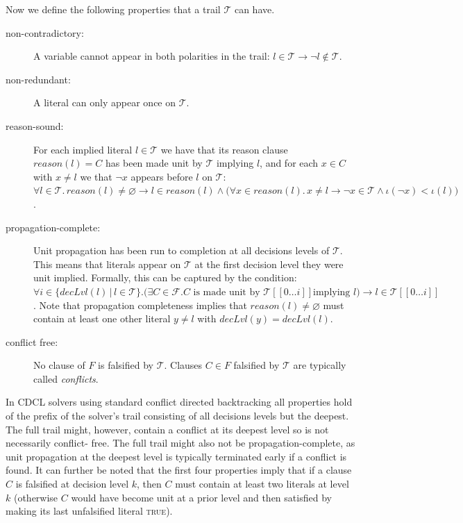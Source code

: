 \documentclass[runningheads]{llncs}
\newcommand{\trail}{\ensuremath{\mathcal{T}}}
\newcommand{\trailIdx}[1]{\ensuremath{\iota(#1)}}
\newcommand{\range}[2]{#1\ldots#2}
\newcommand{\dlevel}[1]{\ensuremath{\mathit{decLvl}(#1)}}
\newcommand{\true}{\textsc{true}\xspace}
\newcommand{\reason}[1]{\ensuremath{\mathit{reason}(#1)}}
\newcommand{\formula}{\ensuremath{\mathcal{F}}}
\renewcommand{\implies}{\rightarrow}
\begin{document}
Now we define the following properties that a trail $\trail$ can have.
\begin{description}
\item[non-contradictory:] A variable cannot appear in both polarities
    in the trail: $l\in \trail\implies \lnot l \not \in \trail$.
\item[non-redundant:] A literal can only appear once on $\trail$.
\item[reason-sound:] For each implied literal $l\in\trail$ we have
    that its reason clause $\reason{l}=C$ has been made unit by
    $\trail$ implying $l$, and for each $x\in C$ with $x\neq l$ we
    that $\lnot x$ appears before $l$ on $\trail$:
    $\forall l\in\trail.\, \reason{l}\neq \varnothing \implies
    l\in\reason{l} \land \bigl(\forall x\in\reason{l}.\, x\neq l
    \implies \lnot x \in \trail \land \trailIdx{\lnot x} <
    \trailIdx{l}\bigr)$.
\item[propagation-complete:] Unit propagation has been run to
    completion at all decisions levels of $\trail$. This means that
    literals appear on $\trail$ at the first decision level they were
    unit implied. Formally, this can be captured by the condition:
    $\forall i \in \{\dlevel{l}\,|\,l\in \trail\}. \bigl(\exists
    C\in\formula. \mbox{$C$ is made unit by $\trail[[\range{0}{i}]]$
      implying $l$}\bigr) \implies l\in \trail[[\range{0}{i}]]$. Note
    that propagation completeness implies that
    $\reason{l}\neq \varnothing$ must contain at least one other
    literal $y\neq l$ with $\dlevel{y} = \dlevel{l}$.
\item[conflict free:] No clause of $F$ is falsified by
    $\trail$. Clauses $C\in F$ falsified by $\trail$ are typically
    called \emph{conflicts}.
\end{description}

In CDCL solvers using standard conflict directed backtracking all
properties hold of the prefix of the solver's trail consisting of all
decisions levels but the deepest. The full trail might, however,
contain a conflict at its deepest level so is not necessarily conflict-
free. The full trail might also not be propagation-complete, as unit
propagation at the deepest level is typically terminated early if a
conflict is found. It can further be noted that the first four
properties imply that if a clause $C$ is falsified at decision level
$k$, then $C$ must contain at least two literals at level $k$
(otherwise $C$ would have become unit at a prior level and then
satisfied by making its last unfalsified literal \true).
\end{document}
